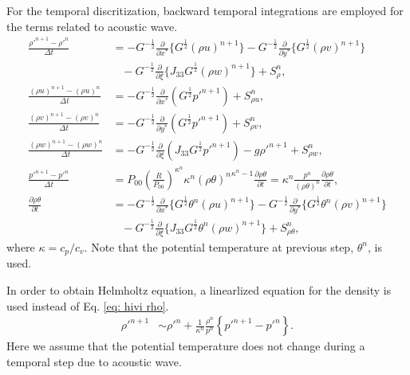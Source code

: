 For the temporal discritization, backward temporal integrations are employed for the terms related to acoustic wave.
\begin{align}
  \frac{\rho'^{n+1}-\rho'^n}{\Delta t} &=
  -G^{-\frac{1}{2}}\frac{\partial}{\partial x^*}\{G^{\frac{1}{2}}(\rho u)^{n+1}\}
  -G^{-\frac{1}{2}}\frac{\partial}{\partial y^*}\{G^{\frac{1}{2}}(\rho v)^{n+1}\} \nonumber\\ & \;\;\;
  -G^{-\frac{1}{2}}\frac{\partial}{\partial \xi}\{J_{33}G^{\frac{1}{2}}(\rho w)^{n+1}\}
  + S_\rho^n, \label{eq: hivi rho} \\
  \frac{(\rho u)^{n+1}-(\rho u)^n}{\Delta t}
  &= -G^{-\frac{1}{2}}\frac{\partial}{\partial x^*}(G^{\frac{1}{2}}p'^{n+1}) + S_{\rho u}^n, \\
  \frac{(\rho v)^{n+1}-(\rho v)^n}{\Delta t}
  &= -G^{-\frac{1}{2}}\frac{\partial}{\partial y^*}(G^{\frac{1}{2}}p'^{n+1}) + S_{\rho v}^n, \\
  \frac{(\rho w)^{n+1}-(\rho w)^n}{\Delta t}
  &= -G^{-\frac{1}{2}}\frac{\partial}{\partial \xi}(J_{33}G^{\frac{1}{2}}p'^{n+1}) -g\rho'^{n+1} + S_{\rho w}^n, \\
  \frac{p'^{n+1} - p'^n}{\Delta t}
  &= P_{00}\left(\frac{R}{P_{00}}\right)^{\kappa^n} \kappa^n {(\rho\theta)^n}^{\kappa^n-1} \frac{\partial \rho\theta}{\partial t}
   = \kappa^n \frac{p^n}{(\rho\theta)^n}\frac{\partial \rho\theta}{\partial t}, \\
  \frac{\partial \rho\theta}{\partial t} &=
  -G^{-\frac{1}{2}}\frac{\partial}{\partial x^*}\{G^{\frac{1}{2}}\theta^n (\rho u)^{n+1}\}
  -G^{-\frac{1}{2}}\frac{\partial}{\partial y^*}\{G^{\frac{1}{2}}\theta^n (\rho v)^{n+1}\}  \nonumber\\ & \;\;\;
  -G^{-\frac{1}{2}}\frac{\partial}{\partial \xi}\{J_{33}G^{\frac{1}{2}}\theta^n (\rho w)^{n+1}\}
  + S_{\rho\theta}^n,
\end{align}
where $\kappa = c_p/c_v$.
Note that the potential temperature at previous step, $\theta^n$, is used.

In order to obtain Helmholtz equation, a linearlized equation for the density is used instead of Eq. \ref{eq: hivi rho}.
\begin{align}
  \rho'^{n+1} &\sim
  \rho'^n + \frac{1}{\kappa^n} \frac{\rho^n}{p^n} \left\{p'^{n+1}-p'^n\right\}.
\end{align}
Here we assume that the potential temperature does not change during a temporal step due to acoustic wave.

